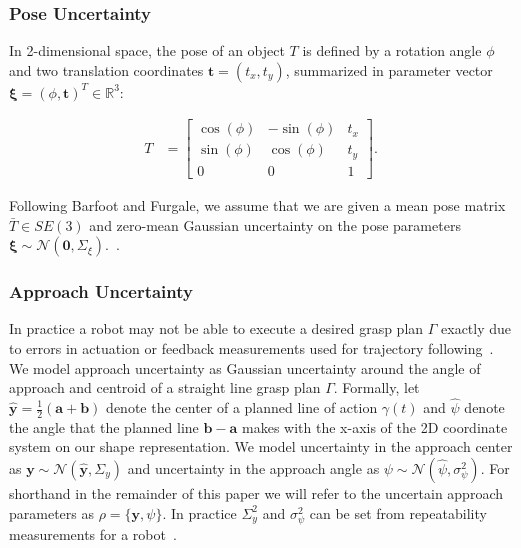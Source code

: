 \documentclass[journal,transmag]{IEEEtran}%
\newcommand{\ba}{\mathbf{a}}
\newcommand{\bb}{\mathbf{b}}
\newcommand{\bt}{\mathbf{t}}
\newcommand{\by}{\mathbf{y}}
\newcommand{\mN}{\mathcal{N}}
\begin{document}
\subsubsection{Pose Uncertainty}
In 2-dimensional space, the pose of an object $T$ is defined by a rotation angle $\phi$ and two translation coordinates $\bt = (t_x, t_y)$, summarized in parameter vector $\mathbf{\xi} = (\phi, \bt)^T \in \mathbb{R}^3$:

\vspace{-2ex}
\begin{align*}
	T &= \left[  \begin{array}{ccc}
		\cos(\phi) & -\sin(\phi) & t_x \\
		\sin(\phi) & \cos(\phi) & t_y \\
		0 & 0 & 1
		\end{array} \right] .
\end{align*}

\noindent Following Barfoot and Furgale, we assume that we are given a mean pose matrix $\bar{T} \in SE(3)$ and zero-mean Gaussian uncertainty on the pose parameters $\mathbf{\xi} \sim \mN \left( \mathbf{0}, \Sigma_{\xi} \right)$.~\cite{barfoot2014Pose}.

 
 \subsubsection{Approach Uncertainty}
In practice a robot may not be able to execute a desired grasp plan $\Gamma$ exactly due to errors in actuation or feedback measurements used for trajectory following~\cite{kehoe2012estimating}.
We model approach uncertainty as Gaussian uncertainty around the angle of approach and centroid of a straight line grasp plan $\Gamma$.
Formally, let $\hat{\by} = \frac{1}{2} (\ba + \bb)$ denote the center of a planned line of action $\gamma(t)$ and $\hat{\psi}$ denote the angle that the planned line $\bb - \ba$ makes with the x-axis of the 2D coordinate system on our shape representation.
We model uncertainty in the approach center as $\by \sim \mN(\hat{\by}, \Sigma_y)$ and uncertainty in the approach angle as $\psi \sim \mN(\hat{\psi}, \sigma_{\psi}^2)$.
For shorthand in the remainder of this paper we will refer to the uncertain approach parameters as $\rho = \{\by, \psi \}$.
In practice $\Sigma_{y}^2$ and $\sigma_{\psi}^2$ can be set from repeatability measurements for a robot~\cite{mooring1986determination}.
\end{document}
